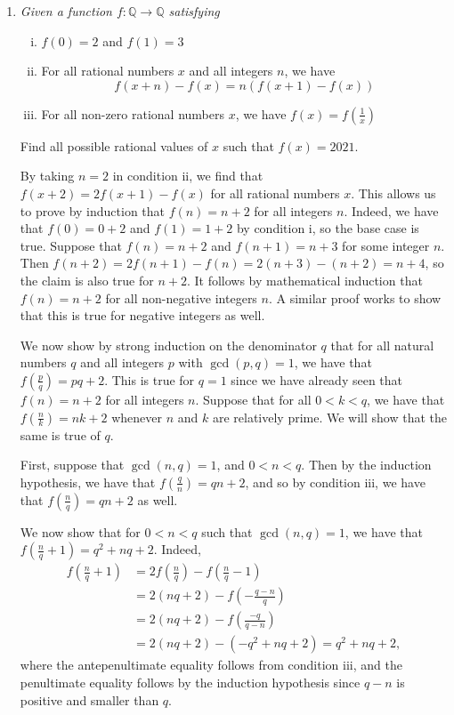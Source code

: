 \documentclass{article}
\begin{document}
\begin{enumerate}[1.]
\item %
{\itshape Given a function $f: \mathbb{Q} \rightarrow \mathbb{Q}$ satisfying
\begin{enumerate}[i)]
  \item $f(0) = 2$ and $f(1) = 3$
  \item For all rational numbers $x$ and all integers $n$, we have 
  $$f(x + n) - f(x) = n(f(x + 1) - f(x)) $$
  \item For all non-zero rational numbers $x$, we have $f(x) = f(\frac{1}{x})$
\end{enumerate}
Find all possible rational values of $x$ such that $f(x) = 2021$.}

By taking $n = 2$ in condition ii, we find that $f(x + 2) = 2f(x + 1) - f(x)$ for all rational numbers $x$. This allows us to prove by induction that $f(n) = n + 2$ for all integers $n$. Indeed, we have that $f(0) = 0 + 2$ and $f(1) = 1 + 2$ by condition i, so the base case is true. Suppose that $f(n) = n + 2$ and $f(n + 1) = n + 3$ for some integer $n$. Then $f(n + 2) = 2f(n + 1) - f(n) = 2(n + 3) - (n + 2) = n + 4$, so the claim is also true for $n + 2$. It follows by mathematical induction that $f(n) = n + 2$ for all non-negative integers $n$. A similar proof works to show that this is true for negative integers as well.

We now show by strong induction on the denominator $q$ that for all natural numbers $q$ and all integers $p$ with $\gcd(p, q) = 1$, we have that $f\left(\frac{p}{q}\right) = pq + 2$. This is true for $q = 1$ since we have already seen that $f(n) = n + 2$ for all integers $n$. Suppose that for all $0 < k < q$, we have that $f\left(\frac{n}{k}\right) = nk + 2$ whenever $n$ and $k$ are relatively prime. We will show that the same is true of $q$.

First, suppose that $\gcd(n, q) = 1$, and $0 < n < q$. Then by the induction hypothesis, we have that $f\left(\frac{q}{n}\right) = qn + 2$, and so by condition iii, we have that $f\left(\frac{n}{q}\right) = qn + 2$ as well.

We now show that for $0 < n < q$ such that $\gcd(n, q) = 1$, we have that $f\left(\frac{n}{q} + 1\right) = q^2 + nq + 2$. Indeed,
\begin{align*}
  f\left(\frac{n}{q} + 1\right) & = 2f\left(\frac{n}{q}\right) - f\left(\frac{n}{q} - 1\right) \\
  & = 2(nq + 2) - f\left(-\frac{q - n}{q}\right) \\
  & = 2(nq + 2) - f\left(\frac{-q}{q - n}\right) \\
  & = 2(nq + 2) - (-q^2 + nq + 2) = q^2 + nq + 2,
\end{align*}
where the antepenultimate equality follows from condition iii, and the penultimate equality follows by the induction hypothesis since $q - n$ is positive and smaller than $q$.


\end{enumerate}
\end{document}

